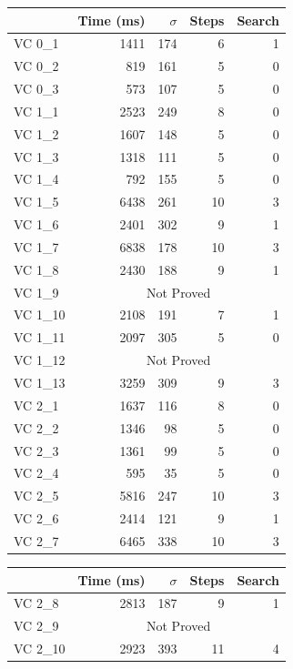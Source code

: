 \begin{figure}
	\centering
	\begin{tabular}{lrrrr}
		\toprule
			& Time (ms)	& $\sigma$& Steps & Search \\
		\midrule
		VC 0\_1	& 1411		& 174 	& 6 	& 1     \\
		VC 0\_2	& 819		& 161	& 5 	& 0     \\
		VC 0\_3	& 573		& 107	& 5 	& 0     \\
		VC 1\_1	& 2523		& 249	& 8 	& 0     \\
		VC 1\_2	& 1607		& 148	& 5	& 0     \\
		VC 1\_3	& 1318		& 111	& 5 	& 0     \\
		VC 1\_4	& 792		& 155	& 5 	& 0     \\
		VC 1\_5	& 6438		& 261	& 10	& 3     \\
		VC 1\_6	& 2401		& 302	& 9 	& 1     \\
		VC 1\_7	& 6838 		& 178	& 10	& 3     \\
		VC 1\_8	& 2430 		& 188	& 9	& 1     \\
		VC 1\_9	& \multicolumn{4}{c}{Not Proved}        \\
		VC 1\_10 & 2108		& 191	& 7 	& 1     \\
		VC 1\_11 & 2097		& 305	& 5 	& 0     \\
		VC 1\_12 & \multicolumn{4}{c}{Not Proved}       \\
		VC 1\_13 & 3259		& 309	& 9	& 3     \\
		VC 2\_1	& 1637		& 116	& 8 	& 0     \\
		VC 2\_2	& 1346		& 98	& 5	& 0     \\
		VC 2\_3	& 1361		& 99	& 5 	& 0     \\
		VC 2\_4	& 595		& 35	& 5 	& 0     \\
		VC 2\_5	& 5816		& 247	& 10	& 3     \\
		VC 2\_6	& 2414		& 121	& 9 	& 1     \\
		VC 2\_7	& 6465 		& 338	& 10	& 3     \\
		\bottomrule
	\end{tabular}
	\quad
	\begin{tabular}{lrrrr}
		\toprule
			& Time (ms)	& $\sigma$& Steps & Search \\
		\midrule
		VC 2\_8	& 2813 		& 187	& 9	& 1     \\
		VC 2\_9	& \multicolumn{4}{c}{Not Proved}        \\
		VC 2\_10 & 2923		& 393	& 11	& 4     \\

\end{tabular}
\end{figure}

